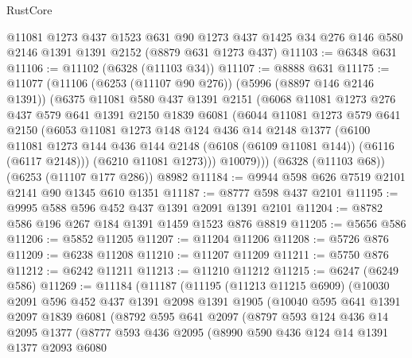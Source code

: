 \begin{lexlean}{RustCore}
\begin{coremodule}
    @11081
    @1273
    @437
    @1523
    @631
    @90
    @1273
    @437
    @1425
    @34
    @276
    @146
    @580
    @2146
    @1391
    @1391
    @2152
    (@8879 @631 @1273 @437)
@11103 := @6348 @631
@11106 := @11102 (@6328 (@11103 @34))
@11107 := @8888 @631
@11175 := @11077
    (@11106
      (@6253 (@11107 @90 @276))
      (@5996 (@8897 @146 @2146 @1391))
      (@6375
        @11081
        @580
        @437
        @1391
        @2151
        (@6068
          @11081
          @1273
          @276
          @437
          @579
          @641
          @1391
          @2150
          @1839
          @6081
          (@6044
            @11081
            @1273
            @579
            @641
            @2150
            (@6053
              @11081
              @1273
              @148
              @124
              @436
              @14
              @2148
              @1377
              (@6100
                @11081
                @1273
                @144
                @436
                @144
                @2148
                (@6108 (@6109 @11081 @144))
                (@6116 (@6117 @2148)))
              (@6210 @11081 @1273)))
          @10079)))
    (@6328 (@11103 @68))
    (@6253 (@11107 @177 @286))
    @8982
@11184 := @9944 @598 @626 @7519 @2101 @2141 @90 @1345 @610 @1351
@11187 := @8777 @598 @437 @2101
@11195 := @9995 @588 @596 @452 @437 @1391 @2091 @1391 @2101
@11204 := @8782 @586 @196 @267 @184 @1391 @1459 @1523 @876 @8819
@11205 := @5656 @586
@11206 := @5852 @11205
@11207 := @11204 @11206
@11208 := @5726 @876
@11209 := @6238 @11208
@11210 := @11207 @11209
@11211 := @5750 @876
@11212 := @6242 @11211
@11213 := @11210 @11212
@11215 := @6247 (@6249 @586)
@11269 := @11184
    (@11187
      (@11195
        (@11213 @11215 @6909)
        (@10030
          @2091
          @596
          @452
          @437
          @1391
          @2098
          @1391
          @1905
          (@10040
            @595
            @641
            @1391
            @2097
            @1839
            @6081
            (@8792
              @595
              @641
              @2097
              (@8797
                @593
                @124
                @436
                @14
                @2095
                @1377
                (@8777
                  @593
                  @436
                  @2095
                  (@8990
                    @590
                    @436
                    @124
                    @14
                    @1391
                    @1377
                    @2093
                    @6080

\end{coremodule}
\end{lexlean}
